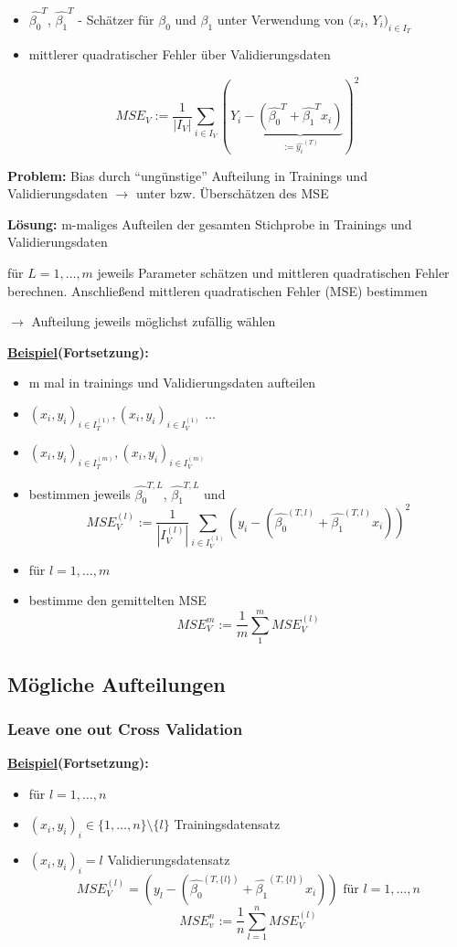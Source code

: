 \begin{itemize}
	\item $ \hat{\beta_0}^T $, $ \hat{\beta_1}^T $ - Schätzer für $\beta_0$ und  $\beta_1$ unter Verwendung von $ (x_i $, $ Y_i $$ )_{i \in I_T} $
	\item mittlerer quadratischer Fehler über Validierungsdaten
\end{itemize}

\[MSE_V := \frac{1}{|I_V|} \sum_{i \in I_V}(Y_i - \underbrace{(  \hat{\beta_0}^T +  \hat{\beta_1}^T x_i)}_{:= \hat{y_i}^{(T)}})^2\]

\textbf{Problem:} Bias durch "`ungünstige"' Aufteilung in Trainings und Validierungsdaten $\rightarrow$
unter bzw. Überschätzen des MSE

\textbf{Lösung:} m-maliges Aufteilen der gesamten Stichprobe in Trainings und Validierungsdaten

für \(L=1,\ldots, m\) jeweils Parameter schätzen und mittleren quadratischen Fehler berechnen. Anschließend mittleren quadratischen Fehler (MSE) bestimmen

$\rightarrow$ Aufteilung jeweils möglichst zufällig wählen

\textbf{\underline{Beispiel}(Fortsetzung):}
\begin{itemize}
	\item m mal in trainings und Validierungsdaten aufteilen
	\item $ (x_i, y_i)_{i \in I_T^{(1)}} , (x_i,y_i)_{i \in I_V^{(1)}} $ $ \ldots $
	\item $ (x_i, y_i)_{i \in I_T^{(m)} }, (x_i,y_i)_{i \in I_V^{(m)}} $
	\item bestimmen jeweils  $\hat{\beta_0}^{T,L}$, $\hat{\beta_1}^{T,L}$ und 
	\[ MSE_V^{(l)} := \frac{1}{|I_V^{(l)}|} \sum_{i \in I_V^{(1)}}(y_i - (\hat{\beta_0}^{(T,l)} + \hat{\beta_1}^{(T,l)} x_i))^2  \]
	\item für $l = 1, \ldots, m$
	\item bestimme den gemittelten MSE
	\[MSE_V^m := \frac{1}{m} \sum_{1}^{m} MSE_V^{(l)}\]
\end{itemize}

\subsection{Mögliche Aufteilungen}
\subsubsection{Leave one out Cross Validation}
\textbf{\underline{Beispiel}(Fortsetzung):}
\begin{itemize}
	\item für \(l = 1,\ldots,n\) 
	\item $(x_i, y_i)_i \in \{1, \ldots, n \} \setminus \{l\}$ Trainingsdatensatz
	\item $(x_i, y_i)_i = l$ Validierungsdatensatz
	\[MSE_V^{(l)} = (y_l - (\hat{\beta_0}^{(T, \{l\})} + \hat{\beta_1}^{(T, \{l\})} x_i)) \text{ für } l = 1,\ldots ,n\]	
	\[MSE_v^n := \frac{1}{n}\sum_{l = 1}^{n} MSE_V^{(l)}\]
\end{itemize}


